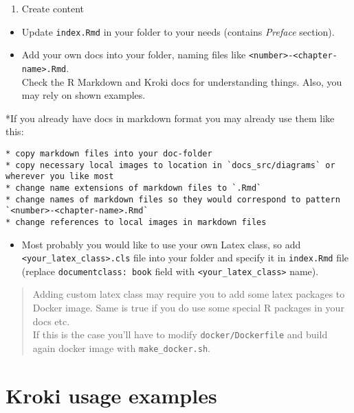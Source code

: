 \documentclass[12pt,a4paper,12pt,oneside,openany]{book}
\providecommand{\tightlist}{%
  \setlength{\itemsep}{0pt}\setlength{\parskip}{0pt}}
\begin{document}
\begin{enumerate}
\def\labelenumi{\arabic{enumi}.}
\setcounter{enumi}{1}
\tightlist
\item
  Create content
\end{enumerate}

\begin{itemize}
\item
  Update \texttt{index.Rmd} in your folder to your needs (contains \emph{Preface} section).
\item
  Add your own docs into your folder, naming files like \texttt{\textless{}number\textgreater{}-\textless{}chapter-name\textgreater{}.Rmd}.\\
  Check the R Markdown and Kroki docs for understanding things. Also, you may rely on shown examples.
\end{itemize}

*If you already have docs in markdown format you may already use them like this:

\begin{verbatim}
* copy markdown files into your doc-folder
* copy necessary local images to location in `docs_src/diagrams` or wherever you like most
* change name extensions of markdown files to `.Rmd`
* change names of markdown files so they would correspond to pattern `<number>-<chapter-name>.Rmd`
* change references to local images in markdown files
\end{verbatim}

\begin{itemize}
\tightlist
\item
  Most probably you would like to use your own Latex class, so add \texttt{\textless{}your\_latex\_class\textgreater{}.cls} file into your folder and specify it in \texttt{index.Rmd} file (replace \texttt{documentclass:\ book} field with \texttt{\textless{}your\_latex\_class\textgreater{}} name).
\end{itemize}

\begin{quote}
Adding custom latex class may require you to add some latex packages to Docker image. Same is true if you do use some special R packages in your docs etc.\\
If this is the case you'll have to modify \texttt{docker/Dockerfile} and build again docker image with \texttt{make\_docker.sh}.
\end{quote}

\hypertarget{examplesKroki}{\chapter{Kroki usage examples}\label{examplesKroki}}
\end{document}
